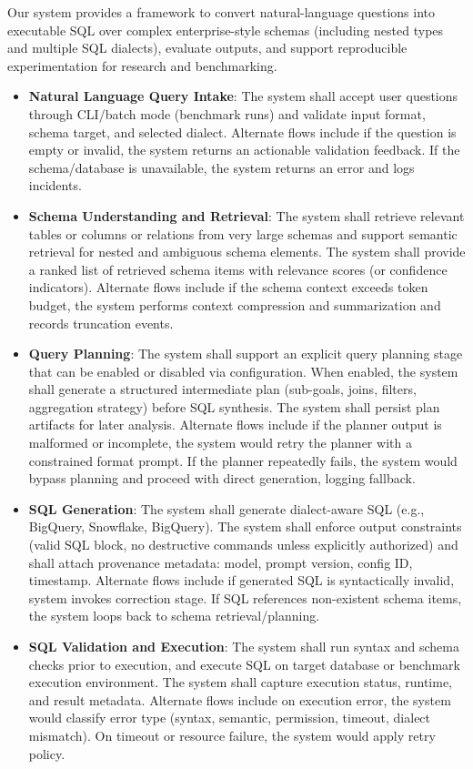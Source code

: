 Our system provides a framework to convert natural-language questions into executable SQL over complex enterprise-style schemas (including nested types and multiple SQL dialects), evaluate outputs, and support reproducible experimentation for research and benchmarking.

\begin{itemize}
    \item \textbf{Natural Language Query Intake}: The system shall accept user questions through CLI/batch mode (benchmark runs) and validate input format, schema target, and selected dialect. Alternate flows include if the question is empty or invalid, the system returns an actionable validation feedback. If the schema/database is unavailable, the system returns an error and logs incidents.
    \item \textbf{Schema Understanding and Retrieval}: The system shall retrieve relevant tables or columns or relations from very large schemas and support semantic retrieval for nested and ambiguous schema elements. The system shall provide a ranked list of retrieved schema items with relevance scores (or confidence indicators). Alternate flows include if the schema context exceeds token budget, the system performs context compression and summarization and records truncation events.
    \item \textbf{Query Planning}: The system shall support an explicit query planning stage that can be enabled or disabled via configuration. When enabled, the system shall generate a structured intermediate plan (sub-goals, joins, filters, aggregation strategy) before SQL synthesis. The system shall persist plan artifacts for later analysis. Alternate flows include if the planner output is malformed or incomplete, the system would retry the planner with a constrained format prompt. If the planner repeatedly fails, the system would bypass planning and proceed with direct generation, logging fallback.
    \item \textbf{SQL Generation}: The system shall generate dialect-aware SQL (e.g., BigQuery, Snowflake, BigQuery). The system shall enforce output constraints (valid SQL block, no destructive commands unless explicitly authorized) and shall attach provenance metadata: model, prompt version, config ID, timestamp. Alternate flows include if generated SQL is syntactically invalid, system invokes correction stage. If SQL references non-existent schema items, the system loops back to schema retrieval/planning.
    \item \textbf{SQL Validation and Execution}: The system shall run syntax and schema checks prior to execution, and execute SQL on target database or benchmark execution environment. The system shall capture execution status, runtime, and result metadata. Alternate flows include on execution error, the system would classify error type (syntax, semantic, permission, timeout, dialect mismatch). On timeout or resource failure, the system would apply retry policy. 

\end{itemize}
